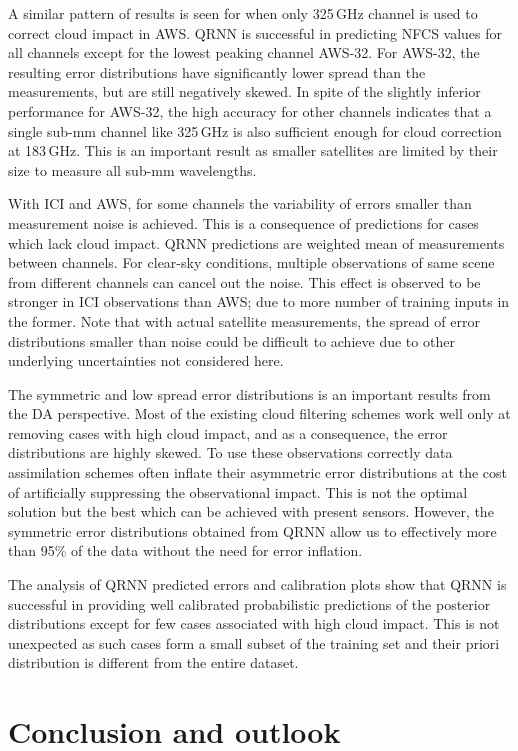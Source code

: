 \documentclass[amt, manuscript]{copernicus}
\begin{document}
A similar pattern of results is seen for when only 325\,GHz channel is used to correct cloud impact in AWS. QRNN is successful in predicting NFCS values for all channels except for the lowest peaking channel AWS-32. For AWS-32, the resulting error distributions have significantly lower spread than the measurements, but are still negatively skewed. In spite of the slightly inferior performance for AWS-32, the high accuracy for other channels indicates that a single sub-mm channel like 325\,GHz is also sufficient enough for cloud correction at 183\,GHz. This is an important result as smaller satellites are limited by their size to measure all sub-mm wavelengths.

With ICI and AWS, for some channels the variability of errors smaller than measurement noise is achieved. This is a consequence of predictions for cases which lack cloud impact. QRNN predictions are weighted mean of measurements between channels. For clear-sky conditions, multiple observations of same scene from different channels can cancel out the noise. This effect is observed to be stronger in ICI observations than AWS; due to more number of training inputs in the former. Note that with actual satellite measurements, the spread of error distributions smaller than noise could be difficult to achieve due to other underlying uncertainties not considered here. 

The symmetric and low spread error distributions is an important results from the DA perspective. Most of the existing cloud filtering schemes work well only at removing cases with high cloud impact, and as a consequence, the error distributions are highly skewed. To use these observations correctly data assimilation schemes often inflate their asymmetric error distributions at the cost of artificially suppressing the observational impact. This is not the optimal solution but the best which can be achieved with present sensors. However, the symmetric error distributions obtained from QRNN allow us to effectively more than 95\% of the data without the need for error inflation. 

The analysis of QRNN predicted errors and calibration plots show that QRNN is successful in providing well calibrated probabilistic predictions of the posterior distributions except for few cases associated with high cloud impact. This is not unexpected as such cases form a small subset of the training set and their priori distribution is different from the entire dataset. 

\section{Conclusion and outlook}  %
\label{conclusions}
%
\end{document}
